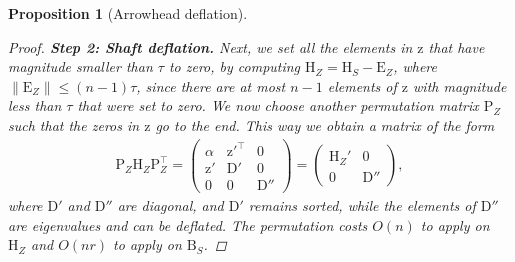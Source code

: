 \documentclass{article}
\newtheorem{proposition}{Proposition}[section]
\newcommand\vecz{\boldsymbol{\mathrm{z}}}
\newcommand\matB{\boldsymbol{\mathrm{B}}}
\newcommand\matD{\boldsymbol{\mathrm{D}}}
\newcommand\matE{\boldsymbol{\mathrm{E}}}
\newcommand\matH{\boldsymbol{\mathrm{H}}}
\newcommand\matP{\boldsymbol{\mathrm{P}}}
\begin{document}
\begin{proposition}[Arrowhead deflation]
\begin{proof}
        \textbf{Step 2: Shaft deflation.} Next, we set all the elements in $\vecz$ that have magnitude smaller than $\tau$ to zero, by computing $\matH_Z = \matH_S-\matE_Z$, where $\|\matE_Z\|\leq (n-1)\tau$, since there are at most $n-1$ elements of $\vecz$ with magnitude less than $\tau$ that were set to zero. 
        We now choose another permutation matrix $\matP_Z$ such that the zeros in $\vecz$ go to the end. This way we obtain a matrix of the form
        \begin{align*} 
            \matP_Z\matH_Z\matP_Z^\top
            =
            \begin{pmatrix}
                \alpha & \vecz'^\top & 0 \\
                \vecz' & \matD' & 0 \\
                0 & 0 & \matD''
            \end{pmatrix}
            =
            \begin{pmatrix}
                \matH_Z' & 0 \\
                0 & \matD''
            \end{pmatrix}
            ,
        \end{align*}
        where $\matD'$ and $\matD''$ are diagonal, and  $\matD'$ remains sorted, while the elements of $\matD''$ are eigenvalues and can be deflated. The permutation costs $O(n)$ to apply on $\matH_Z$ and $O(nr)$ to apply on $\matB_S$. 


\end{proof}
\end{proposition}
\end{document}

